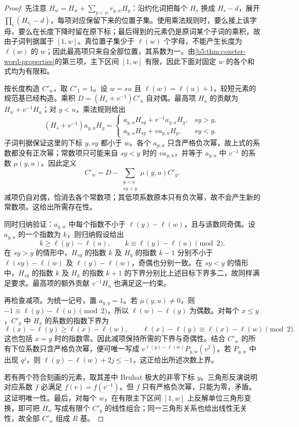 \begin{proof}
	先注意 \(\overline{H_w}=H_w+\sum_{y<w}r_{y,w}H_y\)：沿约化词把每个 \(H_s\) 换成 \(H_s-d\)，展开 \(\prod_i(H_{s_i}-d)\)，每项对应保留下来的位置子集。使用乘法规则时，要么接上该字母，要么在长度下降时留在原下标；最后得到的元素仍是原词某个子词的乘积，故由子词判据属于 \([1,w]\)。真位置子集少于 \(\ell(w)\) 个字母，不能产生长度为 \(\ell(w)\) 的 \(w\)；因此最高项只来自全部位置，其系数为一。由\cref{b5:thm:coxeter-word-properties}的第三项，主下区间 \([1,w]\) 有限，因此下面对固定 \(w\) 的各个和式均为有限和。

	按长度构造 \(C'_w\)，取 \(C'_1=1\)。设 \(w=su\) 且 \(\ell(w)=\ell(u)+1\)，较短元素的规范基已经构造。乘积 \(D=(H_s+v^{-1})C'_u\) 自对偶。最高项 \(H_u\) 的贡献为 \(H_w+v^{-1}H_u\)；对 \(y<u\)，乘法规则给出
	\[
		(H_s+v^{-1})a_{y,u}H_y=
		\begin{cases}
			a_{y,u}H_{sy}+v^{-1}a_{y,u}H_y,&sy>y,\\
			a_{y,u}H_{sy}+v a_{y,u}H_y,&sy<y.
		\end{cases}
	\]
	子词判据保证这里的下标 \(y,sy\) 都小于 \(w\)。各个 \(a_{y,u}\) 只含严格负次幂，故上式的系数都没有正次幂；常数项只可能来自 \(sy<y\) 时的 \(v a_{y,u}\)，并等于 \(a_{y,u}\) 中 \(v^{-1}\) 的系数 \(\mu(y,u)\)。因此定义
	\[
		C'_w=D-\sum_{\substack{y<u\\sy<y}}\mu(y,u)C'_y.
	\]
	减项仍自对偶，恰消去各个常数项；其低项系数原本只有负次幂，故不会产生新的常数项。这给出所需存在性。

	同时归纳验证：\(a_{y,w}\) 中每个指数不小于 \(\ell(y)-\ell(w)\)，且与该数同奇偶。设 \(a_{y,u}\) 的一个指数为 \(k\)，则归纳假设给出
	\[
		k\ge\ell(y)-\ell(u),\qquad k\equiv\ell(y)-\ell(u)\pmod2.
	\]
	在 \(sy>y\) 的情形中，\(H_{sy}\) 的指数 \(k\) 及 \(H_y\) 的指数 \(k-1\) 分别不小于 \(\ell(sy)-\ell(w)\) 及 \(\ell(y)-\ell(w)\)，奇偶也分别一致。在 \(sy<y\) 的情形中，\(H_{sy}\) 的指数 \(k\) 及 \(H_y\) 的指数 \(k+1\) 的下界分别比上述目标下界多二，故同样满足要求。最高项的额外贡献 \(v^{-1}H_u\) 也满足这一约束。

	再检查减项。为统一记号，置 \(a_{y,y}=1\)。若 \(\mu(y,u)\ne0\)，则 \(-1\equiv\ell(y)-\ell(u)\pmod2\)，所以 \(\ell(w)-\ell(y)\) 为偶数。对每个 \(x\le y\)，\(C'_y\) 中 \(H_x\) 的系数的指数下界为
	\[
		\ell(x)-\ell(y)\ge\ell(x)-\ell(w), \qquad \ell(x)-\ell(y)\equiv\ell(x)-\ell(w)\pmod2.
	\]
	这也包括 \(x=y\) 时的指数零。因此减项保持所需的下界与奇偶性。结合 \(C'_w\) 的所有下位系数只含严格负次幂，便可唯一写成 \(v^{\ell(y)-\ell(w)}P_{y,w}(v^2)\)。若 \(P_{y,w}\) 中出现 \(q^j\)，则 \(\ell(y)-\ell(w)+2j\le-1\)，这正给出所述次数上界。

	若有两个符合刻画的元素，取其差中 Bruhat 极大的非零下标 \(y\)。三角形反演说明对应系数 \(f\) 必满足 \(f(v)=f(v^{-1})\)。但 \(f\) 只有严格负次幂，只能为零，矛盾。这证明唯一性。最后，对每个 \(w\)，在有限主下区间 \([1,w]\) 上反解单位三角形变换，即可把 \(H_w\) 写成有限个 \(C'_y\) 的线性组合；同一三角形关系也给出线性无关性，故全部 \(C'_w\) 组成 \(R\) 基。
\end{proof}

